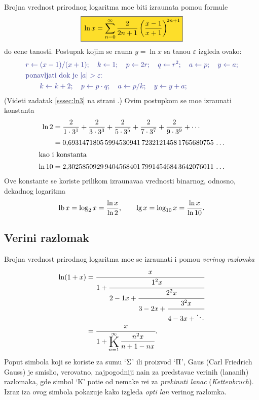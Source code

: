 \documentclass[12pt, twoside, a4paper]{article}
\def\K{\mathop{\vcenter{\hbox{\rm\huge K}}}\limits}
\def\n{n}
\def\Ki{\K_{\n=1}}
\def\Kinf#1#2{\Ki^\infty\displaystyle{\frac{#1}{#2}}}
\def\logten{\log_{10}}
\def\logtwo{\log_2}
\def\.{{,}}
\def\okvir#1{\,\fcolorbox{black}{Goldenrod}{$\displaystyle{\mathstrut #1}$}\,}
\begin{document}
Brojna vrednost prirodnog logaritma mo{\zv}e biti izra{\cv}unata pomo{\cc}u formule
\begin{equation}
\okvir{
\ln x
=\sum_{n=0}^\infty\frac{2}{2n+1}\left(\frac{x-1}{x+1}\right)^{\!2n+1}
}
\label{eq:lnred}
\end{equation}
do {\zv}e{\lj}ene ta{\cv}nosti.
Postupak kojim se ra{\cv}una $y=\ln x$ sa ta{\cv}no{\sv}{\cc}u $\varepsilon$
izgleda ovako:
\def\asg{\leftarrow}%
\begin{equation}
\label{eq:alg}
\begingroup\color{Blue}
\begin{aligned}
&r\asg(x-1)/(x+1);\quad k\asg 1;\quad p\asg 2r;\quad q\asg r^2;\quad a\asg p;\quad y\asg a;\\
&\text{ponav{\lj}ati dok je $|a|>\varepsilon$:}\\
&\qquad k\asg k+2;\quad p\asg p\cdot q;\quad a\asg p/k;\quad y\asg y+a;
\end{aligned}
\endgroup
\end{equation}
(Videti zadatak \ref{sssec:ln3} na strani \pageref{sssec:ln3}.)
Ovim postupkom se mo{\zv}e izra{\cv}unati konstanta
\begin{align*}
\ln2
&=\frac{2}{1\cdot3^1}+\frac{2}{3\cdot3^3}+\frac{2}{5\cdot3^5}+\frac{2}{7\cdot3^7}+\frac{2}{9\cdot3^9}+\cdots\\
\noalign{\smallskip}
&= 0\.
6931471805\,
5994530941\,
7232121458\,
1765680755\,
\ldots\\
\intertext{kao i konstanta}
\ln 10&=2\.
3025850929\,
9404568401\,
7991454684\,
3642076011\,
\ldots
\end{align*}
Ove konstante se koriste prilikom izra{\cv}unava{\nj}a vrednosti binarnog, odnosno, dekadnog logaritma
$$
\lb x=\logtwo x={\ln x\over \ln2},\qquad \lg x=\logten x={\ln x\over \ln 10}.
$$

\subsection{Veri{\zv}ni razlomak}

Brojna vrednost prirodnog logaritma mo{\zv}e se izra{\cv}unati i pomo{\cc}u {\sl veri{\zv}nog razlomka}
\begin{align*}
\ln(1+x)
&=\cfrac{x}{1+\cfrac{1^2x}{2-1x+\cfrac{2^2x}{3-2x+\cfrac{3^2x}{4-3x+\ddots}}}}\\
\noalign{\vskip-3pt}
&=\cfrac{x}{1+ \Kinf{\n^2x}{\n+1-\n x}}.
\end{align*}
Poput simbola koji se koriste za sumu `$\rm\Sigma$' ili proizvod `$\rm\Pi$', 
Gaus (Carl Friedrich Gauss) je smislio, verovatno, najpogodniji na{\cv}in za predstav{\lj}a{\nj}e
veri{\zv}nih (lan{\cv}anih) razlomaka,
gde simbol `K' poti{\cv}e od nema{\cv}ke re{\cv}i za {\sl prekinuti lanac\/} ({\sl Kettenbruch\/}). 
Izraz iza ovog simbola pokazuje kako izgleda {\sl op{\sv}ti {\cv}lan\/} veri{\zv}nog razlomka.
\end{document}
